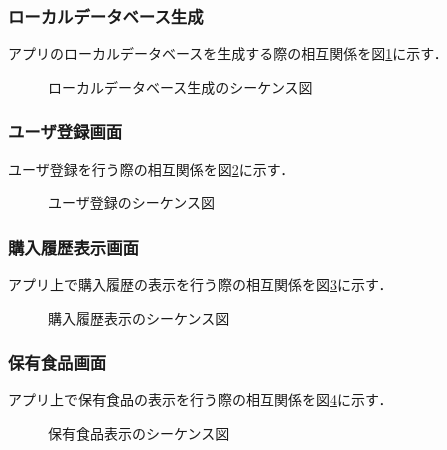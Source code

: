 \documentclass[a4j]{jarticle}
\begin{document}
  \subsubsection{ローカルデータベース生成}
  \label{tabs:HomeActivityAndCreateLocalDatabaseSequence}
  アプリのローカルデータベースを生成する際の相互関係を図\ref{tab:HomeActivityAndCreateLocalDatabaseSequence}に示す．
  \begin{figure}[H]
  \begin{center}
  \caption{ローカルデータベース生成のシーケンス図}
  \label{tab:HomeActivityAndCreateLocalDatabaseSequence}
  \end{center}
  \end{figure}

  \subsubsection{ユーザ登録画面}
  \label{tabs:RegistrationUserForApplicationSequence}
  ユーザ登録を行う際の相互関係を図\ref{tab:RegistrationUserForApplicationSequence}に示す．
  \begin{figure}[H]
  \begin{center}
  \caption{ユーザ登録のシーケンス図}
  \label{tab:RegistrationUserForApplicationSequence}
  \end{center}
  \end{figure}

  \subsubsection{購入履歴表示画面}
  \label{tabs:PurchaseHistorySequence}
  アプリ上で購入履歴の表示を行う際の相互関係を図\ref{tab:PurchaseHistorySequence}に示す．
  \begin{figure}[H]
  \begin{center}
  \caption{購入履歴表示のシーケンス図}
  \label{tab:PurchaseHistorySequence}
  \end{center}
  \end{figure}

  \subsubsection{保有食品画面}
  \label{tabs:HoldingFoodSequence}
  アプリ上で保有食品の表示を行う際の相互関係を図\ref{tab:HoldingFoodSequence}に示す．
  \begin{figure}[H]
  \begin{center}
  \caption{保有食品表示のシーケンス図}
  \label{tab:HoldingFoodSequence}
  \end{center}
  \end{figure}
\end{document}

